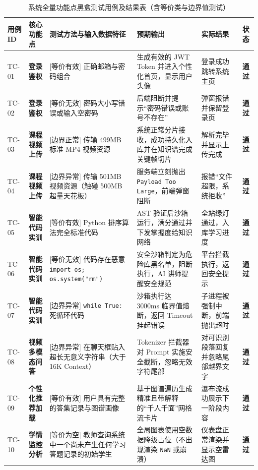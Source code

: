 \begin{table}[htbp]
\centering
\scriptsize
\caption{系统全量功能点黑盒测试用例及结果表（含等价类与边界值测试）}
\label{tab:blackbox_matrix}
\begin{tabular}{|p{1cm}|p{2cm}|p{3.5cm}|p{3.5cm}|p{3cm}|p{1cm}|}
\hline
\textbf{用例ID} & \textbf{核心功能点} & \textbf{测试方法与输入数据特征} & \textbf{预期输出} & \textbf{实际结果} & \textbf{状态} \\ \hline
TC-01 & \textbf{登录鉴权} & [等价有效] 正确邮箱与密码组合 & 生成有效的 JWT Token 并进入个性化首页，显示用户头像 & 登录成功跳转系统主页 & \textbf{通过} \\ \hline
TC-02 & \textbf{登录鉴权} & [等价无效] 密码大小写错误或输入空密码 & 后端阻断并提示“密码错误或账号不存在” & 弹窗报错并保留登录页 & \textbf{通过} \\ \hline
TC-03 & \textbf{课程视频上传} & [边界正常] 传输 499MB 标准 MP4 视频资源 & 系统正常分片接收，成功持久化入库并在知识谱完成关键帧切片 & 解析完毕并显示上传完成 & \textbf{通过} \\ \hline
TC-04 & \textbf{课程视频上传} & [边界异常] 传输 501MB 视频资源（触碰 500MB 超量天花板） & 服务端立刻抛出 \texttt{Payload Too Large}，前端弹窗阻断 & 报错“文件超限，系统拒收” & \textbf{通过} \\ \hline
TC-05 & \textbf{智能代码实训} & [等价有效] Python 排序算法完全标准代码 & AST 验证后沙箱运行，满分通过并下发掌握度给知识网络 & 全站绿灯通过，入库学习进度 & \textbf{通过} \\ \hline
TC-06 & \textbf{智能代码实训} & [等价无效] 代码存在恶意 \texttt{import os; os.system("rm")} & 安全沙箱判定为危险库黑名单，阻断执行，AI 讲师提醒安全规范 & 平台拦截执行，返回安全提示 & \textbf{通过} \\ \hline
TC-07 & \textbf{智能代码实训} & [边界异常] \texttt{while True:} 死循环代码 & 沙箱执行达 3000ms 临界值熔断，返回 Timeout 挂起错误 & 子进程被强制中断，前端抛出超时 & \textbf{通过} \\ \hline
TC-08 & \textbf{视频多模态问答} & [边界异常] 在聊天框贴入超长无意义字符串（大于 16K Context） & Tokenizer 拦截器对 Prompt 实施安全截断，忽略无效字符尾部 & 对可识别段落回复并忽略尾部越界文字 & \textbf{通过} \\ \hline
TC-09 & \textbf{个性化推荐加载} & [等价有效] 用户具有完整的答集记录与图谱画像 & 基于图谱遍历生成精准且带解释的“千人千面”网格流卡片 & 瀑布流成功展示下一阶段内容 & \textbf{通过} \\ \hline
TC-10 & \textbf{学情监控分析} & [等价为空] 教师查询系统中一个尚未产生任何学习答题记录的初始学生 & 全局图表使用空数据降级占位（不出现渲染 \texttt{NaN} 或崩溃） & 仪表盘正常渲染并显示空雷达图 & \textbf{通过} \\ \hline
\end{tabular}
\end{table}


